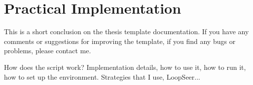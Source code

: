 \chapter{Practical Implementation}

This is a short conclusion on the thesis template documentation. If you have any comments or suggestions for improving the template, if you find any bugs or problems, please contact me. 

How does the script work? Implementation details, how to use it, how to run it, how to set up the environment. Strategies that I use, LoopSeer...
